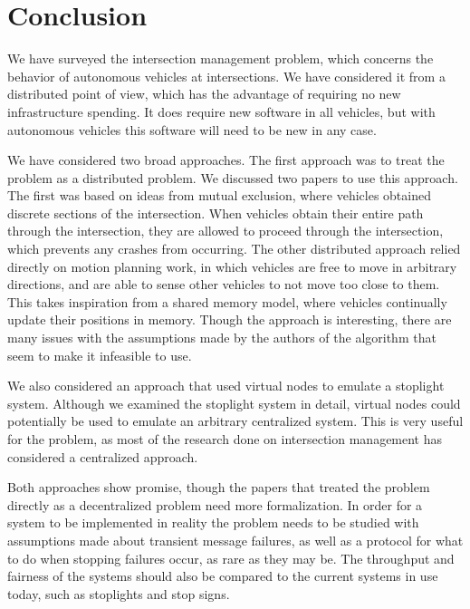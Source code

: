 \documentclass[12pt]{article}
\begin{document}
\section{Conclusion}
We have surveyed the intersection management problem, which concerns the behavior of autonomous vehicles at intersections. We have considered it from a distributed point of view, which has the advantage of requiring no new infrastructure spending. It does require new software in all vehicles, but with autonomous vehicles this software will need to be new in any case.\par
We have considered two broad approaches. The first approach was to treat the problem as a distributed problem. We discussed two papers to use this approach. The first was based on ideas from mutual exclusion, where vehicles obtained discrete sections of the intersection. When vehicles obtain their entire path through the intersection, they are allowed to proceed through the intersection, which prevents any crashes from occurring. The other distributed approach relied directly on motion planning work, in which vehicles are free to move in arbitrary directions, and are able to sense other vehicles to not move too close to them. This takes inspiration from a shared memory model, where vehicles continually update their positions in memory. Though the approach is interesting, there are many issues with the assumptions made by the authors of the algorithm that seem to make it infeasible to use.\par
We also considered an approach that used virtual nodes to emulate a stoplight system. Although we examined the stoplight system in detail, virtual nodes could potentially be used to emulate an arbitrary centralized system. This is very useful for the problem, as most of the research done on intersection management has considered a centralized approach.\par
Both approaches show promise, though the papers that treated the problem directly as a decentralized problem need more formalization. In order for a system to be implemented in reality the problem needs to be studied with assumptions made about transient message failures, as well as a protocol for what to do when stopping failures occur, as rare as they may be. The throughput and fairness of the systems should also be compared to the current systems in use today, such as stoplights and stop signs.

\label{sec:conclusion}

\pagebreak
\end{document}
